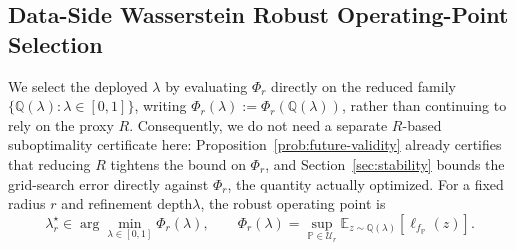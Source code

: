\subsection{Data-Side Wasserstein Robust Operating-Point Selection}\label{subsec:wro}
We select the deployed $\lambda$ by evaluating $\Phi_r$ directly on the reduced family $\{\mathbb Q(\lambda):\lambda\in[0,1]\}$, writing $\Phi_r(\lambda) := \Phi_r(\mathbb Q(\lambda))$, rather than continuing to rely on the proxy $R$.
Consequently, we do not need a separate $R$-based suboptimality certificate here: Proposition~\ref{prob:future-validity} already certifies that reducing $R$ tightens the bound on $\Phi_r$, and Section~\ref{sec:stability} bounds the grid-search error directly against $\Phi_r$, the quantity actually optimized.
For a fixed radius $r$ and refinement depth$\lambda$, the robust operating point is
\[
\lambda_r^\star \in \arg\min_{\lambda\in[0,1]} \Phi_r(\lambda),
\qquad
\Phi_r(\lambda) = \sup_{\mathbb{P}\in\mathcal U_r} \mathbb E_{z\sim\mathbb{Q}(\lambda)}\left[\ell_{f_\mathbb{P}}(z)\right].
\]

